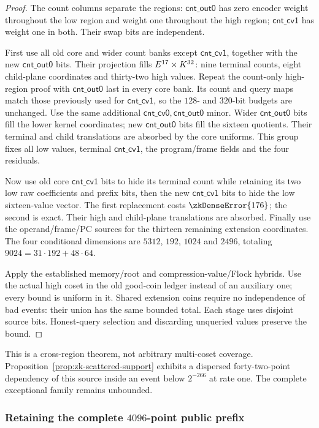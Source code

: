 \begin{proof}
The count columns separate the regions: $\mathsf{cnt\_out0}$ has zero encoder weight throughout the low region and weight one throughout the high region; $\mathsf{cnt\_cv1}$ has weight one in both. Their swap bits are independent.

First use all old core and wider count banks except $\mathsf{cnt\_cv1}$, together with the new $\mathsf{cnt\_out0}$ bits. Their projection fills $E^{17}\times K^{32}$: nine terminal counts, eight child-plane coordinates and thirty-two high values. Repeat the count-only high-region proof with $\mathsf{cnt\_out0}$ last in every core bank. Its count and query maps match those previously used for $\mathsf{cnt\_cv1}$, so the $128$- and $320$-bit budgets are unchanged. Use the same additional $\mathsf{cnt\_cv0},\mathsf{cnt\_out0}$ minor. Wider $\mathsf{cnt\_out0}$ bits fill the lower kernel coordinates; new $\mathsf{cnt\_out0}$ bits fill the sixteen quotients. Their terminal and child translations are absorbed by the core uniforms. This group fixes all low values, terminal $\mathsf{cnt\_cv1}$, the program/frame fields and the four residuals.

Now use old core $\mathsf{cnt\_cv1}$ bits to hide its terminal count while retaining its two low raw coefficients and prefix bits, then the new $\mathsf{cnt\_cv1}$ bits to hide the low sixteen-value vector. The first replacement costs $\zkDenseError{176}$; the second is exact. Their high and child-plane translations are absorbed. Finally use the operand/frame/PC sources for the thirteen remaining extension coordinates. The four conditional dimensions are $5312$, $192$, $1024$ and $2496$, totaling $9024=31\cdot192+48\cdot64$.

Apply the established memory/root and compression-value/Flock hybrids. Use the actual high coset in the old good-coin ledger instead of an auxiliary one; every bound is uniform in it. Shared extension coins require no independence of bad events: their union has the same bounded total. Each stage uses disjoint source bits. Honest-query selection and discarding unqueried values preserve the bound.
\end{proof}

This is a cross-region theorem, not arbitrary multi-coset coverage. Proposition~\ref{prop:zk-scattered-support} exhibits a dispersed forty-two-point dependency of this source inside an event below $2^{-266}$ at rate one. The complete exceptional family remains unbounded.

\subsubsection{Retaining the complete $4096$-point public prefix}

